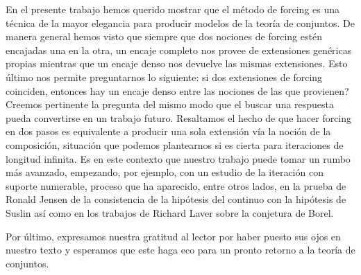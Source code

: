 \documentclass[11pt]{unam_tesis1}
\theoremstyle{MyThmStyle}
\theoremstyle{definition}
\theoremstyle{plain}
\theoremstyle{remark}
\begin{document}
En el presente trabajo hemos querido mostrar que el m\'etodo de forcing es una t\'ecnica de la mayor elegancia para producir modelos de la teor\'ia de conjuntos. De manera general hemos visto que siempre que dos nociones de forcing est\'en encajadas una en la otra, un encaje completo nos provee de extensiones gen\'ericas propias mientras que un encaje denso nos devuelve las mismas extensiones. Esto \'ultimo nos permite preguntarnos lo siguiente: \textquestiondown si dos extensiones de forcing coinciden, entonces hay un encaje denso entre las nociones de las que provienen? Creemos pertinente la pregunta del mismo modo que el buscar una respuesta pueda convertirse en un trabajo futuro. Resaltamos el hecho de que hacer forcing en dos pasos es equivalente a producir una sola extensi\'on v\'ia la noci\'on de la composici\'on, situaci\'on que podemos plantearnos si es cierta para iteraciones de longitud infinita. Es en este contexto que nuestro trabajo puede tomar un rumbo m\'as avanzado, empezando, por ejemplo, con un estudio de la iteraci\'on con suporte numerable, proceso que ha aparecido, entre otros lados, en la prueba de Ronald Jensen de la consistencia de la hip\'otesis del continuo con la hip\'otesis de Suslin as\'i como en los trabajos de Richard Laver sobre la conjetura de Borel.

Por \'ultimo, expresamos nuestra gratitud al lector por haber puesto sus ojos en nuestro texto y esperamos que este haga eco para un pronto retorno a la teor\'ia de conjuntos.
\end{document}
